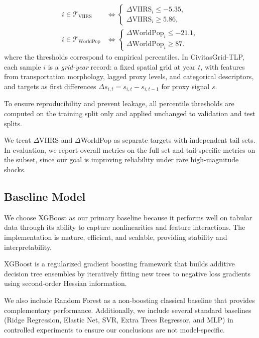 \documentclass[preprint,12pt]{elsarticle}
\begin{document}
\begin{equation}
\begin{aligned}
i\in\mathcal{T}_{\mathrm{VIIRS}} &\iff
\begin{cases}
\Delta \mathrm{VIIRS}_i \le -5.35,\\
\Delta \mathrm{VIIRS}_i \ge 5.86,
\end{cases}\\
i\in\mathcal{T}_{\mathrm{WorldPop}} &\iff
\begin{cases}
\Delta \mathrm{WorldPop}_i \le -21.1,\\
\Delta \mathrm{WorldPop}_i \ge 87.
\end{cases}
\end{aligned}
\end{equation}
where the thresholds correspond to empirical percentiles. In CivitasGrid-TLP, each sample $i$ is a \emph{grid-year} record: a fixed spatial grid at year $t$, with features from transportation morphology, lagged proxy levels, and categorical descriptors, and targets as first differences $\Delta s_{i,t} = s_{i,t}-s_{i,t-1}$ for proxy signal $s$.

To ensure reproducibility and prevent leakage, all percentile thresholds are computed on the training split only and applied unchanged to validation and test splits.

We treat $\Delta$VIIRS and $\Delta$WorldPop as separate targets with independent tail sets. In evaluation, we report overall metrics on the full set and tail-specific metrics on the subset, since our goal is improving reliability under rare high-magnitude shocks.

\subsection{Baseline Model}

We choose XGBoost as our primary baseline because it performs well on tabular data through its ability to capture nonlinearities and feature interactions. The implementation is mature, efficient, and scalable, providing stability and interpretability.

XGBoost is a regularized gradient boosting framework that builds additive decision tree ensembles by iteratively fitting new trees to negative loss gradients using second-order Hessian information.

We also include Random Forest as a non-boosting classical baseline that provides complementary performance. Additionally, we include several standard baselines (Ridge Regression, Elastic Net, SVR, Extra Trees Regressor, and MLP) in controlled experiments to ensure our conclusions are not model-specific.
\end{document}
